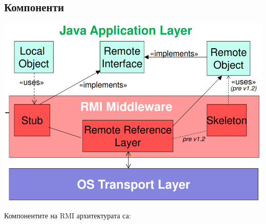 \documentclass[11pt]{article} %
\begin{document}
\subsection{Компоненти}
\begin{center}
	\includegraphics[scale=0.5]{Components.png}
\end{center}
Компонентите на RMI архитектурата са:
\end{document}
